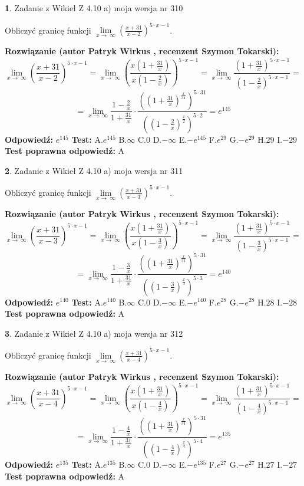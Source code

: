 \documentclass[12pt, a4paper]{article}
\theoremstyle{definition} %
\newtheorem{zad}{}
\newcommand{\zadStart}[1]{\begin{zad}#1\newline}
\newcommand{\zadStop}{\end{zad}}
\newcommand{\rozwStart}[2]{\noindent \textbf{Rozwiązanie (autor #1 , recenzent #2): }\newline}
\newcommand{\rozwStop}{\newline}
\newcommand{\odpStart}{\noindent \textbf{Odpowiedź:}\newline}
\newcommand{\odpStop}{\newline}
\newcommand{\testStart}{\noindent \textbf{Test:}\newline}
\newcommand{\testStop}{\newline}
\newcommand{\kluczStart}{\noindent \textbf{Test poprawna odpowiedź:}\newline}
\newcommand{\kluczStop}{\newline}
\begin{document}
\zadStart{Zadanie z Wikieł Z 4.10 a) moja wersja nr 310}

Obliczyć granicę funkcji  $\lim\limits_{x\to\ \infty}(\frac{x+31}{x-2})^{5\cdot x-1}$.
\zadStop
\rozwStart{Patryk Wirkus}{Szymon Tokarski}
$$\lim\limits_{x\to\ \infty}(\frac{x+31}{x-2})^{5\cdot x-1} = \lim\limits_{x\to\ \infty}(\frac{x(1+\frac{31}{x})}{x(1-\frac{2}{x})})^{5\cdot x-1}=\lim\limits_{x\to\ \infty}\frac{(1+\frac{31}{x})^{5\cdot x-1}}{(1-\frac{2}{x})^{5\cdot x-1}}=$$
$$=\lim\limits_{x\to\ \infty}\frac{1-\frac{2}{x}}{1+\frac{31}{x}}\cdot\frac{((1+\frac{31}{x})^{\frac{x}{31}})^{5\cdot31}}{((1-\frac{2}{x})^{\frac{x}{2}})^{5\cdot2}}=e^{145}$$
\rozwStop
\odpStart
$e^{145}$
\odpStop
\testStart
A.$e^{145}$ B.$\infty$ C.$0$ D.$-\infty$ E.$-e^{145}$
F.$e^{29}$ G.$-e^{29}$
H.$29$
I.$-29$
\testStop
\kluczStart
A
\kluczStop



\zadStart{Zadanie z Wikieł Z 4.10 a) moja wersja nr 311}

Obliczyć granicę funkcji  $\lim\limits_{x\to\ \infty}(\frac{x+31}{x-3})^{5\cdot x-1}$.
\zadStop
\rozwStart{Patryk Wirkus}{Szymon Tokarski}
$$\lim\limits_{x\to\ \infty}(\frac{x+31}{x-3})^{5\cdot x-1} = \lim\limits_{x\to\ \infty}(\frac{x(1+\frac{31}{x})}{x(1-\frac{3}{x})})^{5\cdot x-1}=\lim\limits_{x\to\ \infty}\frac{(1+\frac{31}{x})^{5\cdot x-1}}{(1-\frac{3}{x})^{5\cdot x-1}}=$$
$$=\lim\limits_{x\to\ \infty}\frac{1-\frac{3}{x}}{1+\frac{31}{x}}\cdot\frac{((1+\frac{31}{x})^{\frac{x}{31}})^{5\cdot31}}{((1-\frac{3}{x})^{\frac{x}{3}})^{5\cdot3}}=e^{140}$$
\rozwStop
\odpStart
$e^{140}$
\odpStop
\testStart
A.$e^{140}$ B.$\infty$ C.$0$ D.$-\infty$ E.$-e^{140}$
F.$e^{28}$ G.$-e^{28}$
H.$28$
I.$-28$
\testStop
\kluczStart
A
\kluczStop



\zadStart{Zadanie z Wikieł Z 4.10 a) moja wersja nr 312}

Obliczyć granicę funkcji  $\lim\limits_{x\to\ \infty}(\frac{x+31}{x-4})^{5\cdot x-1}$.
\zadStop
\rozwStart{Patryk Wirkus}{Szymon Tokarski}
$$\lim\limits_{x\to\ \infty}(\frac{x+31}{x-4})^{5\cdot x-1} = \lim\limits_{x\to\ \infty}(\frac{x(1+\frac{31}{x})}{x(1-\frac{4}{x})})^{5\cdot x-1}=\lim\limits_{x\to\ \infty}\frac{(1+\frac{31}{x})^{5\cdot x-1}}{(1-\frac{4}{x})^{5\cdot x-1}}=$$
$$=\lim\limits_{x\to\ \infty}\frac{1-\frac{4}{x}}{1+\frac{31}{x}}\cdot\frac{((1+\frac{31}{x})^{\frac{x}{31}})^{5\cdot31}}{((1-\frac{4}{x})^{\frac{x}{4}})^{5\cdot4}}=e^{135}$$
\rozwStop
\odpStart
$e^{135}$
\odpStop
\testStart
A.$e^{135}$ B.$\infty$ C.$0$ D.$-\infty$ E.$-e^{135}$
F.$e^{27}$ G.$-e^{27}$
H.$27$
I.$-27$
\testStop
\kluczStart
A
\kluczStop
\end{document}
